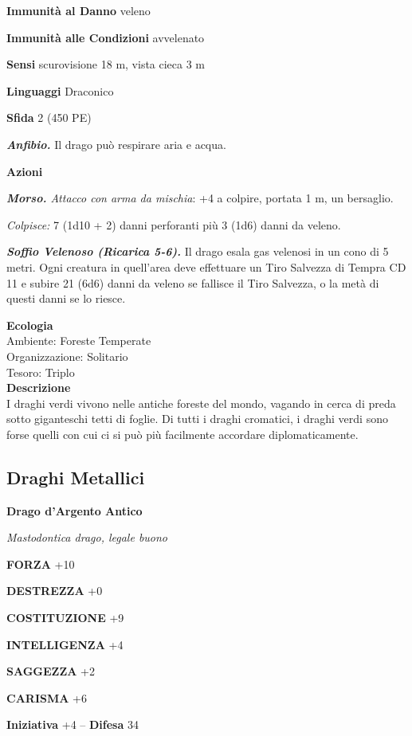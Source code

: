 \begin{multicols}{2}
\textbf{Immunità al Danno} veleno 

\textbf{Immunità alle Condizioni} avvelenato

\textbf{Sensi} scurovisione 18 m, vista cieca 3 m

\textbf{Linguaggi} Draconico

\textbf{Sfida} 2 (450 PE)

\emph{\textbf{Anfibio.}} Il drago può respirare aria e acqua.

\textbf{Azioni}

\emph{\textbf{Morso.} Attacco con arma da mischia}: +4 a colpire, portata 1 m, un bersaglio.

\emph{Colpisce:} 7 (1d10 + 2) danni perforanti più 3 (1d6) danni da veleno.

\emph{\textbf{Soffio Velenoso (Ricarica 5-6).}} Il drago esala gas velenosi in un cono di 5 metri. Ogni creatura in quell'area deve effettuare un Tiro Salvezza di Tempra CD 11 e subire 21 (6d6) danni da veleno se fallisce il Tiro Salvezza, o la metà di questi danni se lo riesce.

\textbf{Ecologia}\\
Ambiente: Foreste Temperate\\
Organizzazione: Solitario\\
Tesoro: Triplo\\
\textbf{Descrizione}\\
I draghi verdi vivono nelle antiche foreste del mondo, vagando in cerca di preda sotto giganteschi tetti di foglie. Di tutti i draghi cromatici, i draghi verdi sono forse quelli con cui ci si può più facilmente accordare diplomaticamente.\\


\subsection{Draghi Metallici}

\medskip{}\textbf{Drago d'Argento Antico}

\emph{Mastodontica drago, legale buono}

\textbf{FORZA} +10

\textbf{DESTREZZA} +0

\textbf{COSTITUZIONE} +9

\textbf{INTELLIGENZA} +4

\textbf{SAGGEZZA} +2

\textbf{CARISMA} +6

\textbf{Iniziativa} +4 -- \textbf{Difesa} 34


\end{multicols}
